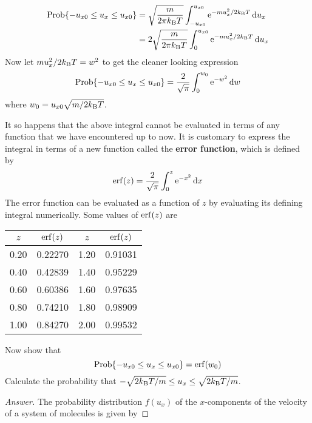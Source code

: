 \documentclass[../psets.tex]{subfiles}
\begin{document}
\begin{enumerate}[label={\textbf{27-\arabic*.}},leftmargin=3.5em]
    \begin{align*}
        \Prob\{-u_{x0}\leq u_x\leq u_{x0}\} &= \sqrt{\frac{m}{2\pi\kB T}}\int_{-u_{x0}}^{u_{x0}}\e[-mu_x^2/2\kB T]\dd{u_x}\\
        &= 2\sqrt{\frac{m}{2\pi\kB T}}\int_0^{u_{x0}}\e[-mu_x^2/2\kB T]\dd{u_x}
    \end{align*}
    Now let $mu_x^2/2\kB T=w^2$ to get the cleaner looking expression
    \begin{equation*}
        \Prob\{-u_{x0}\leq u_x\leq u_{x0}\} = \frac{2}{\sqrt{\pi}}\int_0^{w_0}\e[-w^2]\dd{w}
    \end{equation*}
    where $w_0=u_{x0}\sqrt{m/2\kB T}$.\par
    It so happens that the above integral cannot be evaluated in terms of any function that we have encountered up to now. It is customary to express the integral in terms of a new function called the \textbf{error function}, which is defined by
    \begin{equation*}
        \erf(z) = \frac{2}{\sqrt{\pi}}\int_0^z\e[-x^2]\dd{x}
    \end{equation*}
    The error function can be evaluated as a function of $z$ by evaluating its defining integral numerically. Some values of $\erf(z)$ are
    \begin{center}
        \small
        \renewcommand{\arraystretch}{1.4}
        \begin{tabular}{cc|cc}
            $z$ & $\erf(z)$ & $z$ & $\erf(z)$\\
            \hline
            0.20 & 0.22270 & 1.20 & 0.91031\\
            0.40 & 0.42839 & 1.40 & 0.95229\\
            0.60 & 0.60386 & 1.60 & 0.97635\\
            0.80 & 0.74210 & 1.80 & 0.98909\\
            1.00 & 0.84270 & 2.00 & 0.99532\\
        \end{tabular}
    \end{center}
    Now show that
    \begin{equation*}
        \Prob\{-u_{x0}\leq u_x\leq u_{x0}\} = \erf(w_0)
    \end{equation*}
    Calculate the probability that $-\sqrt{2\kB T/m}\leq u_x\leq\sqrt{2\kB T/m}$.
    \begin{proof}[Answer]
        The probability distribution $f(u_x)$ of the $x$-components of the velocity of a system of molecules is given by

\end{proof}
\end{enumerate}
\end{document}
